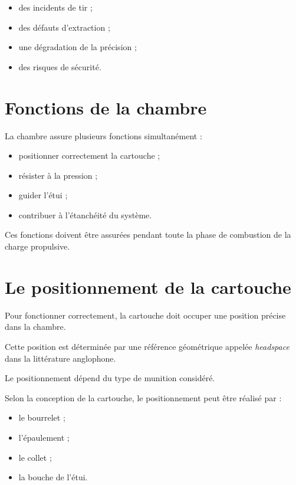 \begin{itemize}
    \item des incidents de tir ;
    \item des défauts d'extraction ;
    \item une dégradation de la précision ;
    \item des risques de sécurité.
\end{itemize}

\section{Fonctions de la chambre}

La chambre assure plusieurs fonctions simultanément :

\begin{itemize}
    \item positionner correctement la cartouche ;
    \item résister à la pression ;
    \item guider l'étui ;
    \item contribuer à l'étanchéité du système.
\end{itemize}

Ces fonctions doivent être assurées pendant toute la phase de combustion de
la charge propulsive.

\section{Le positionnement de la cartouche}

Pour fonctionner correctement, la cartouche doit occuper une position
précise dans la chambre.

Cette position est déterminée par une référence géométrique appelée
\emph{headspace} dans la littérature anglophone.

Le positionnement dépend du type de munition considéré.

\begin{exemple}

Selon la conception de la cartouche, le positionnement peut être réalisé
par :

\begin{itemize}
    \item le bourrelet ;
    \item l'épaulement ;
    \item le collet ;
    \item la bouche de l'étui.
\end{itemize}

\end{exemple}

